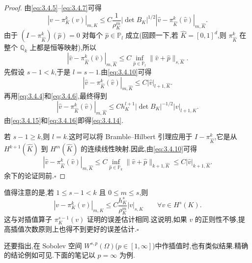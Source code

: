 \begin{proof}
由\eqref{eq:3.4.5}–\eqref{eq:3.4.7}可得
\begin{equation}\label{eq:3.4.15}
  |v-\pi_K^k(v)|_{m,K}
  \le C\frac1{\rho_K^m}|\det B_K|^{1/2}
      |\widehat v-\pi_{\widehat K}^k(\widehat v)|_{m,\widehat K}.
\end{equation}
由于 \((I-\pi_{\widehat K}^k)(\widehat p)=0\) 对每个 \(\widehat p\in\mathbb P_l\) 成立(回顾一下,若 \(\widehat K=[0,1]^d\),则 \(\pi_{\widehat K}^k\) 在整个 \(\mathbb Q_k\) 上都是恒等映射),所以
\[
  |\widehat v-\pi_{\widehat K}^k(\widehat v)|_{m,\widehat K}
  \le C\inf_{\widehat p\in\mathbb P_l}\|\widehat v+\widehat p\|_{s,\widehat K}.
\]
先假设 \(s-1<k\),于是 \(l=s-1\).由\eqref{eq:3.4.10}可得
\[
  |\widehat v-\pi_{\widehat K}^k(\widehat v)|_{m,\widehat K}
  \le C|\widehat v|_{l+1,\widehat K}.
\]
再用\eqref{eq:3.4.4}和\eqref{eq:3.4.6},最终得到
\begin{equation}\label{eq:3.4.16}
  |\widehat v-\pi_{\widehat K}^k(\widehat v)|_{m,\widehat K}
  \le Ch_K^{l+1}|\det B_K|^{-1/2}|v|_{l+1,K}.
\end{equation}
由\eqref{eq:3.4.15}和\eqref{eq:3.4.16}即得\eqref{eq:3.4.14}.

若 \(s-1\ge k\),则 \(l=k\).这时可以将 Bramble--Hilbert 引理应用于 \(I-\pi_{\widehat K}^k\),它是从 \(H^{k+1}(\widehat K)\) 到 \(H^m(\widehat K)\) 的连续线性映射.因此,由\eqref{eq:3.4.10}可得
\[
  |\widehat v-\pi_{\widehat K}^k(\widehat v)|_{m,\widehat K}
  \le C\inf_{\widehat p\in\mathbb P_k}\|\widehat v+\widehat p\|_{k+1,\widehat K}
  \le C|\widehat v|_{k+1,\widehat K}.
\]
余下的论证同前.\hfill\(\square\)
\end{proof}

\begin{note}
值得注意的是,若 \(1\le s-1<k\) 且 \(0\le m\le s\),则
\begin{equation}\label{eq:3.4.17}
  |v-\pi_K^k(v)|_{m,K}\le C\frac{h_K^s}{\rho_K^m}|v|_{s,K}
  \qquad \forall v\in H^s(K).
\end{equation}
这与对插值算子 \(\pi_K^{s-1}(v)\) 证明的误差估计相同.这说明,如果 \(v\) 的正则性不够,提高插值次数原则上也得不到更好的误差估计.\hfill\(\square\)
\end{note}

还要指出,在 Sobolev 空间 \(W^{s,p}(\Omega)\)(\(p\in[1,\infty]\))中作插值时,也有类似结果.精确的结论例如可见.下面的笔记以 \(p=\infty\) 为例.

